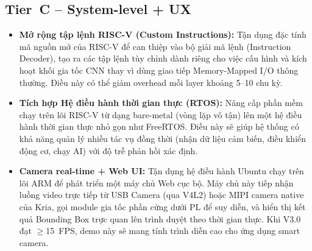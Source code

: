 \subsection*{Tier~C -- System-level + UX}
\begin{itemize}
    \item \textbf{Mở rộng tập lệnh RISC-V (Custom Instructions):} Tận dụng đặc tính mã nguồn mở của RISC-V để can thiệp vào bộ giải mã lệnh (Instruction Decoder), tạo ra các tập lệnh tùy chỉnh dành riêng cho việc cấu hình và kích hoạt khối gia tốc CNN thay vì dùng giao tiếp Memory-Mapped I/O thông thường. Điều này có thể giảm overhead mỗi layer khoảng 5--10 chu kỳ.
    \item \textbf{Tích hợp Hệ điều hành thời gian thực (RTOS):} Nâng cấp phần mềm chạy trên lõi RISC-V từ dạng bare-metal (vòng lặp vô tận) lên một hệ điều hành thời gian thực nhỏ gọn như FreeRTOS. Điều này sẽ giúp hệ thống có khả năng quản lý nhiều tác vụ đồng thời (nhận dữ liệu cảm biến, điều khiển động cơ, chạy AI) với độ trễ phản hồi xác định.
    \item \textbf{Camera real-time + Web UI:} Tận dụng hệ điều hành Ubuntu chạy trên lõi ARM để phát triển một máy chủ Web cục bộ. Máy chủ này tiếp nhận luồng video trực tiếp từ USB Camera (qua V4L2) hoặc MIPI camera native của Kria, gọi module gia tốc phần cứng dưới PL để suy diễn, và hiển thị kết quả Bounding Box trực quan lên trình duyệt theo thời gian thực. Khi V3.0 đạt $\geq$15~FPS, demo này sẽ mang tính trình diễn cao cho ứng dụng smart camera.
\end{itemize}
